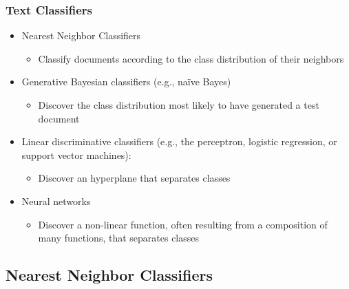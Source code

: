 \documentclass{beamer}
\begin{document}

\begin{frame}
  \frametitle{Text Classifiers}

  \begin{itemize}
  \item Nearest Neighbor Classifiers
    \begin{itemize}
    \item Classify documents according to the class distribution of their neighbors
    \end{itemize}
  \item Generative Bayesian classifiers (e.g., na{\"i}ve Bayes)
    \begin{itemize}
    \item Discover the class distribution most likely to have generated a test
      document
    \end{itemize}
  \item Linear discriminative classifiers (e.g., the perceptron, logistic regression, or support vector machines):
    \begin{itemize}
    \item Discover an hyperplane that separates classes
    \end{itemize}
  \item Neural networks
    \begin{itemize}
    \item Discover a non-linear function, often resulting from a composition of many functions, that separates classes
    \end{itemize}    
  \end{itemize}

\end{frame}

\subsection{Nearest Neighbor Classifiers}
\end{document}
